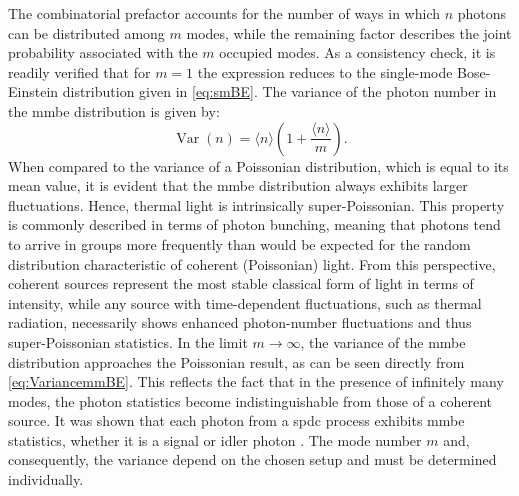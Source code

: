 The combinatorial prefactor accounts for the number of ways in which $n$ photons can be distributed among $m$ modes, while the remaining factor describes the joint probability associated with the $m$ occupied modes. As a consistency check, it is readily verified that for $m=1$ the expression reduces to the single-mode Bose-Einstein distribution given in \autoref{eq:smBE}.  \newline
The variance of the photon number in the \acrshort{mmbe} distribution is given by:
\begin{equation}
	\operatorname{Var}(n) = \langle n\rangle\left(1+\frac{\langle n\rangle}{m}\right).
	\label{eq:VariancemmBE}
\end{equation}
When compared to the variance of a Poissonian distribution, which is equal to its mean value, it is evident that the \acrshort{mmbe} distribution always exhibits larger fluctuations. Hence, thermal light is intrinsically super-Poissonian. This property is commonly described in terms of photon bunching, meaning that photons tend to arrive in groups more frequently than would be expected for the random distribution characteristic of coherent (Poissonian) light. \newline
From this perspective, coherent sources represent the most stable classical form of light in terms of intensity, while any source with time-dependent fluctuations, such as thermal radiation, necessarily shows enhanced photon-number fluctuations and thus super-Poissonian statistics. \newline
In the limit $m \to \infty$, the variance of the \acrshort{mmbe} distribution approaches the Poissonian result, as can be seen directly from \autoref{eq:VariancemmBE}. This reflects the fact that in the presence of infinitely many modes, the photon statistics become indistinguishable from those of a coherent source. \newline
It was shown that each photon from a \acrshort{spdc} process exhibits \acrshort{mmbe} statistics, whether it is a signal or idler photon \cite{kimPhotoncountingStatisticsbasedSupport2022}. The mode number $m$ and, consequently, the variance depend on the chosen setup and must be determined individually.


